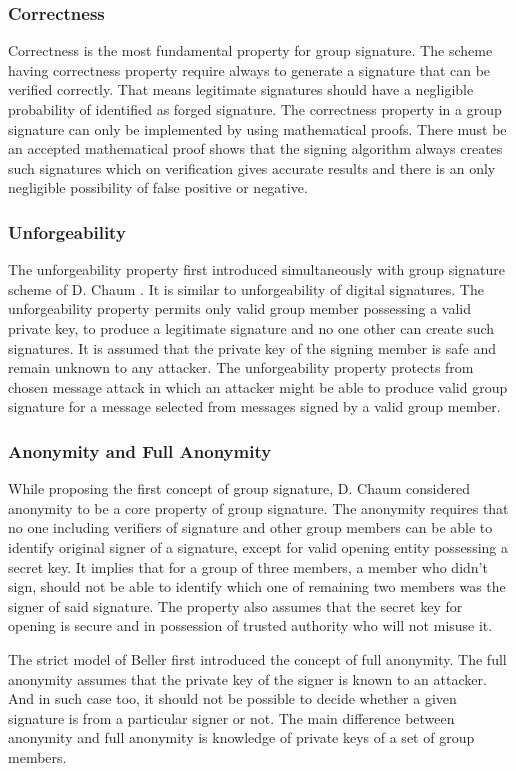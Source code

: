 \subsubsection{Correctness}
Correctness is the most fundamental property for group signature. The scheme having correctness property require always to generate a signature that can be verified correctly. That means legitimate signatures should have a negligible probability of identified as forged signature. The correctness property in a group signature can only be implemented by using mathematical proofs. There must be an accepted mathematical proof shows that the signing algorithm always creates such signatures which on verification gives accurate results and there is an only negligible possibility of false positive or negative.
\subsubsection{Unforgeability}
The unforgeability property first introduced simultaneously with group signature scheme of D. Chaum \cite{chaum1991group}. It is similar to unforgeability of digital signatures. The unforgeability property permits only valid group member possessing a valid private key, to produce a legitimate signature and no one other can create such signatures. It is assumed that the private key of the signing member is safe and remain unknown to any attacker. The unforgeability property protects from chosen message attack in which an attacker might be able to produce valid group signature for a message selected from messages signed by a valid group member.
\subsubsection{Anonymity and Full Anonymity}
While proposing the first concept of group signature, D. Chaum considered anonymity to be a core property of group signature\cite{chaum1991group}. The anonymity requires that no one including verifiers of signature and other group members can be able to identify original signer of a signature, except for valid opening entity possessing a secret key. It implies that for a group of three members, a member who didn't sign, should not be able to identify which one of remaining two members was the signer of said signature. The property also assumes that the secret key for opening is secure and in possession of trusted authority who will not misuse it.

The strict model of Beller first introduced the concept of full anonymity\cite{bellare2003foundations}. The full anonymity assumes that the private key of the signer is known to an attacker. And in such case too, it should not be possible to decide whether a given signature is from a particular signer or not. The main difference between anonymity and full anonymity is knowledge of private keys of a set of group members.
